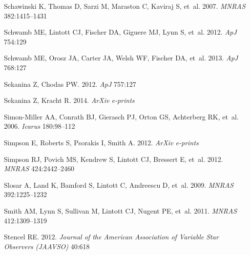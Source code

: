 \documentclass{ar2e}
\def\apj{ApJ}
\def\mnras{MNRAS}
\begin{document}
\begin{thebibliography}{}
{Schawinski} K, {Thomas} D, {Sarzi} M, {Maraston} C, {Kaviraj} S, et~al. 2007.
\newblock \textit{\mnras} 382:1415--1431

{Schwamb} ME, {Lintott} CJ, {Fischer} DA, {Giguere} MJ, {Lynn} S, et~al. 2012.
\newblock \textit{\apj} 754:129

{Schwamb} ME, {Orosz} JA, {Carter} JA, {Welsh} WF, {Fischer} DA, et~al. 2013.
\newblock \textit{\apj} 768:127

{Sekanina} Z, {Chodas} PW. 2012.
\newblock \textit{\apj} 757:127

{Sekanina} Z, {Kracht} R. 2014.
\newblock \textit{ArXiv e-prints}

{Simon-Miller} AA, {Conrath} BJ, {Gierasch} PJ, {Orton} GS, {Achterberg} RK,
  et~al. 2006.
\newblock \textit{Icarus} 180:98--112

{Simpson} E, {Roberts} S, {Psorakis} I, {Smith} A. 2012.
\newblock \textit{ArXiv e-prints}
  
{Simpson} RJ, {Povich} MS, {Kendrew} S, {Lintott} CJ, {Bressert} E, et~al.
  2012.
\newblock \textit{\mnras} 424:2442--2460

{Slosar} A, {Land} K, {Bamford} S, {Lintott} C, {Andreescu} D, et~al. 2009.
\newblock \textit{\mnras} 392:1225--1232

{Smith} AM, {Lynn} S, {Sullivan} M, {Lintott} CJ, {Nugent} PE, et~al. 2011.
\newblock \textit{\mnras} 412:1309--1319

{Stencel} RE. 2012.
\newblock \textit{Journal of the American Association of Variable Star
  Observers (JAAVSO)} 40:618


\end{thebibliography}
\end{document}

